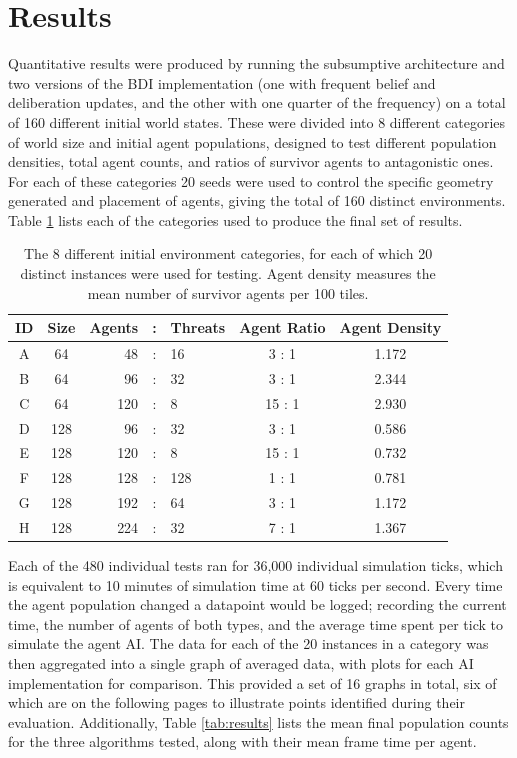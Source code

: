 \documentclass[a4paper,12pt]{article}
\begin{document}
\newpage
\section{Results}
\noindent
Quantitative results were produced by running the subsumptive architecture and two versions of the BDI implementation (one with frequent belief and deliberation updates, and the other with one quarter of the frequency) on a total of 160 different initial world states. These were divided into 8 different categories of world size and initial agent populations, designed to test different population densities, total agent counts, and ratios of survivor agents to antagonistic ones. For each of these categories 20 seeds were used to control the specific geometry generated and placement of agents, giving the total of 160 distinct environments. Table \ref{tab:environs} lists each of the categories used to produce the final set of results.

\begin{table}[ht]
\centering
\begin{tabular}{|c|c|rcl|c|c|} \hline
{\bf ID} & {\bf Size} & {\bf Agents} & : & {\bf Threats} & {\bf Agent Ratio} & {\bf Agent Density} \\ \hline
A & 64 & 48 & : & 16 & 3 : 1 & 1.172 \\
B & 64 & 96 & : & 32 & 3 : 1 & 2.344 \\
C & 64 & 120 & : & 8 & 15 : 1 & 2.930 \\ \hline
D & 128 & 96 & : & 32 & 3 : 1 & 0.586 \\
E & 128 & 120 & : & 8 & 15 : 1 & 0.732 \\
F & 128 & 128 & : & 128 & 1 : 1 & 0.781 \\
G & 128 & 192 & : & 64 & 3 : 1 & 1.172 \\
H & 128 & 224 & : & 32 & 7 : 1 & 1.367 \\ \hline
\end{tabular}
\caption{The 8 different initial environment categories, for each of which 20 distinct instances were used for testing. Agent density measures the mean number of survivor agents per 100 tiles.}
\label{tab:environs}
\end{table}

Each of the 480 individual tests ran for 36,000 individual simulation ticks, which is equivalent to 10 minutes of simulation time at 60 ticks per second. Every time the agent population changed a datapoint would be logged; recording the current time, the number of agents of both types, and the average time spent per tick to simulate the agent AI. The data for each of the 20 instances in a category was then aggregated into a single graph of averaged data, with plots for each AI implementation for comparison. This provided a set of 16 graphs in total, six of which are on the following pages to illustrate points identified during their evaluation. Additionally, Table \ref{tab:results} lists the mean final population counts for the three algorithms tested, along with their mean frame time per agent.
\end{document}
